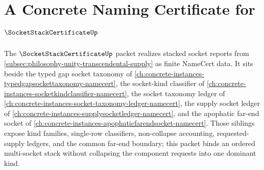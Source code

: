 \chapter{A Concrete Naming Certificate for $\SocketStackCertificateUp$}
\label{ch:concrete-instances-socketstackcertificate-namecert}

The $\SocketStackCertificateUp$ packet realizes stacked socket reports from \autoref{subsec:philosophy-unity-transcendental-supply} as finite NameCert data. It sits beside the typed gap socket taxonomy of \autoref{ch:concrete-instances-typedgapsockettaxonomy-namecert}, the socket-kind classifier of \autoref{ch:concrete-instances-socketkindclassifier-namecert}, the socket taxonomy ledger of \autoref{ch:concrete-instances-socket-taxonomy-ledger-namecert}, the supply socket ledger of \autoref{ch:concrete-instances-supplysocketledger-namecert}, and the apophatic far-end socket of \autoref{ch:concrete-instances-apophaticfarendsocket-namecert}. Those siblings expose kind families, single-row classifiers, non-collapse accounting, requested-supply ledgers, and the common far-end boundary; this packet binds an ordered multi-socket stack without collapsing the component requests into one dominant kind.

